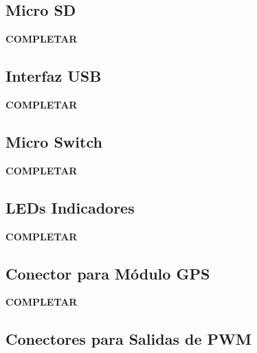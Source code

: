 \subsection{Micro SD}

\textbf{{\color{red} COMPLETAR}}

\subsection{Interfaz USB}

\textbf{{\color{red} COMPLETAR}}

\subsection{Micro Switch}

\textbf{{\color{red} COMPLETAR}}

\subsection{LEDs Indicadores}

\textbf{{\color{red} COMPLETAR}}

\subsection{Conector para Módulo GPS}

\textbf{{\color{red} COMPLETAR}}

\subsection{Conectores para Salidas de PWM}

